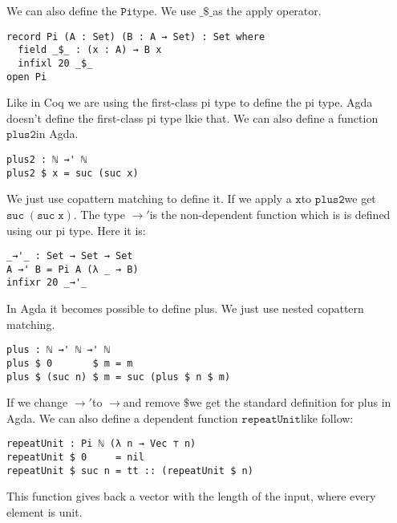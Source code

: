 \documentclass[a4paper,cleardoubleempty,BCOR1cm]{scrbook}
\begin{document}
We can also define the $\mathtt{Pi}$\;type.  We use $\mathtt{\_\$\_}$\;as the apply operator.

\begin{verbatim}
record Pi (A : Set) (B : A → Set) : Set where
  field _$_ : (x : A) → B x
  infixl 20 _$_
open Pi
\end{verbatim}

Like in Coq we are using the first-class pi type to define the pi type. Agda
doesn't define the first-class pi type lkie that.  We
can also define a function $\mathtt{plus2}$\;in Agda.

\begin{verbatim}
plus2 : ℕ →' ℕ
plus2 $ x = suc (suc x)
\end{verbatim}

We just use copattern matching to define it. If we apply a $\mathtt{x}$\;to $\mathtt{plus2}$\;we
get \linebreak $\mathtt{suc\;(suc\;x)}$. The type $\mathtt{\rightarrow'}$\;is the non-dependent
function which is is defined
using our pi type. Here it is:

\begin{verbatim}
_→'_ : Set → Set → Set
A →' B = Pi A (λ _ → B)
infixr 20 _→'_
\end{verbatim}

In Agda it becomes possible to define plus. We just use nested copattern
matching.

\begin{verbatim}
plus : ℕ →' ℕ →' ℕ
plus $ 0       $ m = m
plus $ (suc n) $ m = suc (plus $ n $ m)
\end{verbatim}

If we change $\mathtt{\rightarrow'}$\;to $\mathtt{\rightarrow}$\;and remove $\mathtt{\$}$\;we get the
standard definition for plus in Agda. We can also define a dependent function
$\mathtt{repeatUnit}$\;like follow:
\begin{verbatim}
repeatUnit : Pi ℕ (λ n → Vec ⊤ n)
repeatUnit $ 0     = nil
repeatUnit $ suc n = tt :: (repeatUnit $ n)
\end{verbatim}
This function gives back a vector with the length of the input, where every element
is unit.
\end{document}
